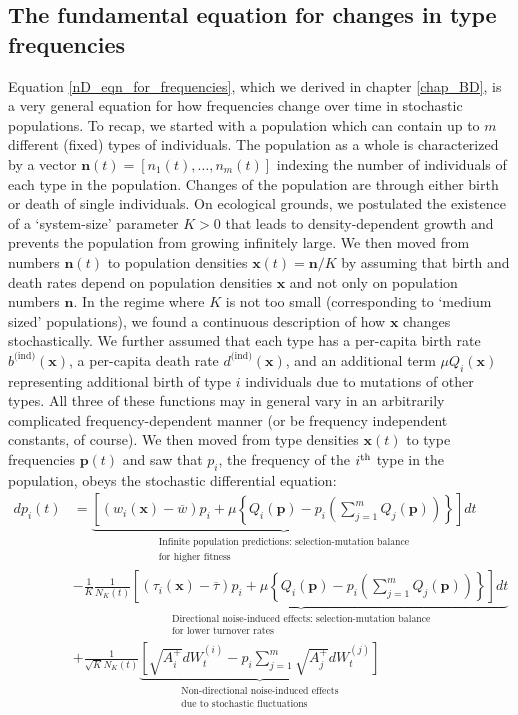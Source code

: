 \subsection{The fundamental equation for changes in type frequencies}\label{sec_fun_theorem_freq}
Equation \eqref{nD_eqn_for_frequencies}, which we derived in chapter \ref{chap_BD}, is a very general equation for how frequencies change over time in stochastic populations. To recap, we started with a population which can contain up to $m$ different (fixed) types of individuals. The population as a whole is characterized by a vector $\mathbf{n}(t) = [n_1(t), \ldots, n_m(t)]$ indexing the number of individuals of each type in the population. Changes of the population are through either birth or death of single individuals. On ecological grounds, we postulated the existence of a `system-size' parameter $K>0$ that leads to density-dependent growth and prevents the population from growing infinitely large. We then moved from numbers $\mathbf{n}(t)$ to population densities $\mathbf{x}(t)=\mathbf{n}/K$ by assuming that birth and death rates depend on population densities $\mathbf{x}$ and not only on population numbers $\mathbf{n}$. In the regime where $K$ is not too small (corresponding to `medium sized' populations), we found a continuous description of how $\mathbf{x}$ changes stochastically. We further assumed that each type has a per-capita birth rate $b^{\textrm{(ind)}}(\mathbf{x})$, a per-capita death rate $d^{\textrm{(ind)}}(\mathbf{x})$, and an additional term $\mu Q_{i}(\mathbf{x})$ representing additional birth of type $i$ individuals due to mutations of other types. All three of these functions may in general vary in an arbitrarily complicated frequency-dependent manner (or be frequency independent constants, of course). We then moved from type densities $\mathbf{x}(t)$ to type frequencies $\mathbf{p}(t)$ and saw that $p_i$, the frequency of the $i\textsuperscript{th}$ type in the population, obeys the stochastic differential equation:
\begin{equation}
\label{nD_stochastic_RM}
\begin{aligned}
dp_i(t) &= \underbrace{\left[(w_i(\mathbf{x}) - \overline{w})p_i + \mu\left\{Q_i(\mathbf{p}) - p_i\left(\sum\limits_{j=1}^{m}Q_j(\mathbf{p})\right)\right\}\right]dt}_{\substack{\text{Infinite population predictions: selection-mutation balance} \\ \text{for higher fitness}}}\\
&- \frac{1}{K}\underbrace{\frac{1}{N_{K}(t)}\left[(\tau_i(\mathbf{x}) - \overline{\tau})p_i + \mu\left\{Q_i(\mathbf{p}) - p_i\left(\sum\limits_{j=1}^{m}Q_j(\mathbf{p})\right)\right\}\right]dt}_{\substack{\text{Directional noise-induced effects: selection-mutation balance}\\\text{for lower turnover rates}}}\\
&+ \frac{1}{\sqrt{K}N_{K}(t)}\underbrace{\left[\sqrt{A^{+}_{i}}dW^{(i)}_t - p_i\sum\limits_{j=1}^{m}\sqrt{A^{+}_{j}}dW^{(j)}_t\right]}_{\substack{\text{Non-directional noise-induced effects}\\\text{due to stochastic fluctuations}}}
\end{aligned}
\end{equation}
